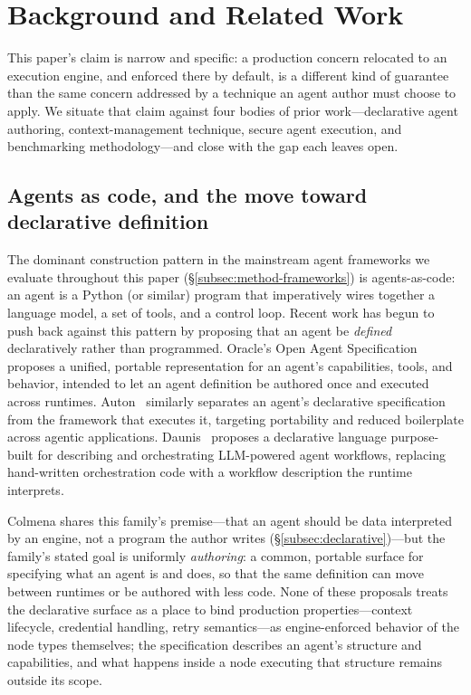 \section{Background and Related Work}
\label{sec:related-work}

This paper's claim is narrow and specific: a production concern relocated
to an execution engine, and enforced there by default, is a different kind
of guarantee than the same concern addressed by a technique an agent
author must choose to apply. We situate that claim against four bodies of
prior work---declarative agent authoring, context-management technique,
secure agent execution, and benchmarking methodology---and close with the
gap each leaves open.

\subsection{Agents as code, and the move toward declarative definition}
\label{subsec:rw-declarative}

The dominant construction pattern in the mainstream agent frameworks we
evaluate throughout this paper (\S\ref{subsec:method-frameworks}) is
agents-as-code: an agent is a Python (or similar) program that
imperatively wires together a language model, a set of tools, and a
control loop. Recent work has begun to push back against this pattern by
proposing that an agent be \emph{defined} declaratively rather than
programmed. Oracle's Open Agent Specification~\cite{amini2025} proposes a
unified, portable representation for an agent's capabilities, tools, and
behavior, intended to let an agent definition be authored once and
executed across runtimes. Auton~\cite{cao2026} similarly separates an
agent's declarative specification from the framework that executes it,
targeting portability and reduced boilerplate across agentic
applications. Daunis~\cite{daunis2025} proposes a declarative language
purpose-built for describing and orchestrating LLM-powered agent
workflows, replacing hand-written orchestration code with a workflow
description the runtime interprets.

Colmena shares this family's premise---that an agent should be data
interpreted by an engine, not a program the author writes
(\S\ref{subsec:declarative})---but the family's stated goal is uniformly
\emph{authoring}: a common, portable surface for specifying what an agent
is and does, so that the same definition can move between runtimes or
be authored with less code. None of these proposals treats the
declarative surface as a place to bind production properties---context
lifecycle, credential handling, retry semantics---as engine-enforced
behavior of the node types themselves; the specification describes an
agent's structure and capabilities, and what happens inside a node
executing that structure remains outside its scope.

